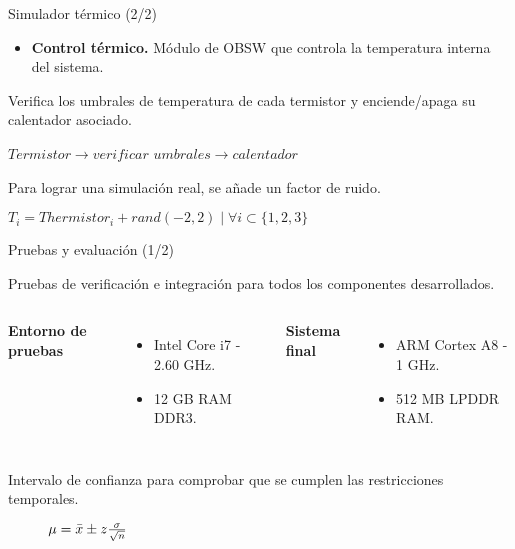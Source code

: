 \begin{frame}{Simulador térmico (2/2)}

\begin{itemize}
\item \textbf{Control térmico.} Módulo de OBSW que controla la temperatura interna del sistema. 
\end{itemize}

Verifica los umbrales de temperatura de cada termistor y enciende/apaga su calentador asociado.

\begin{center}
$Termistor \rightarrow verificar$ $umbrales \rightarrow calentador$
\end{center}

Para lograr una simulación real, se añade un factor de ruido.

\begin{center}
$T_{i} = Thermistor_{i} + rand (-2,2) \mid \forall i \subset \{1,2,3\}$
\end{center}
 
\end{frame}



\begin{frame}{Pruebas y evaluación (1/2)}

Pruebas de verificación e integración para todos los componentes desarrollados.

\begin{columns}


\begin{center}
\textbf{Entorno de pruebas}
\end{center}

\begin{itemize}
\item Intel Core i7 - 2.60 GHz.
\item 12 GB RAM DDR3.
\end{itemize}


\begin{center}
\textbf{Sistema final}
\end{center}

\begin{itemize}
\item ARM Cortex A8 - 1 GHz.
\item 512 MB LPDDR RAM.
\end{itemize}

\end{columns}

\vspace{0.1 in}

Intervalo de confianza para comprobar que se cumplen las restricciones temporales.

\begin{figure}
$\mu = \bar{x}  \pm z {\sigma \over \sqrt{n}}$
\end{figure}

\end{frame}


